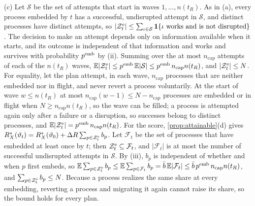 {\sloppy (c) Let $\mathcal S$ be the set of attempts that start in waves $1,\dots,n(t_R)$. As in (a), every process embedded by $t$ has a successful, undisrupted attempt in $\mathcal S$, and distinct processes have distinct attempts, so $|\mathcal Z^{\rm e}_t|\le\sum_{\iota\in\mathcal S}\mathbf 1\{\iota\text{ works and is not disrupted}\}$. The decision to make an attempt depends only on information available when it starts, and its outcome is independent of that information and works and survives with probability $p^{\rm emb}$ by (ii). Summing over the at most $n_{\mathrm{cap}}$ attempts of each of the $n(t_R)$ waves, $\mathbb E|\mathcal Z^{\rm e}_t|\le p^{\rm emb}\,\mathbb E|\mathcal S|\le p^{\rm emb}\,n_{\mathrm{cap}}n(t_R)$, and $|\mathcal Z^{\rm e}_t|\le N$. For equality, let the plan attempt, in each wave, $n_{\mathrm{cap}}$ processes that are neither embedded nor in flight, and never revert a process voluntarily. At the start of wave $w\le n(t_R)$ at most $n_{\mathrm{cap}}(w-1)\le N-n_{\mathrm{cap}}$ processes are embedded or in flight when $N\ge n_{\mathrm{cap}}n(t_R)$, so the wave can be filled; a process is attempted again only after a failure or a disruption, so successes belong to distinct processes, and $\mathbb E|\mathcal Z^{\rm e}_t|=p^{\rm emb}\,n_{\mathrm{cap}}n(t_R)$. For the score, \autoref{prop:attainable}(d) gives $R^*_X(\vartheta_t)=R^*_X(\vartheta_0)+\Delta R\sum_{p\in\mathcal Z^{\rm e}_t}b_p$. Let $\mathcal F_t$ be the set of processes that have embedded at least once by $t$; then $\mathcal Z^{\rm e}_t\subseteq\mathcal F_t$, and $|\mathcal F_t|$ is at most the number of successful undisrupted attempts in $\mathcal S$. By (iii), $b_p$ is independent of whether and when $p$ first embeds, so $\mathbb E\sum_{p\in\mathcal Z^{\rm e}_t}b_p\le\mathbb E\sum_{p\in\mathcal F_t}b_p=\bar b\,\mathbb E|\mathcal F_t|\le\bar b\,p^{\rm emb}\,n_{\mathrm{cap}}n(t_R)$, and $\sum_{p\in\mathcal Z^{\rm e}_t}b_p\le N$. Because a process realizes the same share at every embedding, reverting a process and migrating it again cannot raise its share, so the bound holds for every plan.\par}

